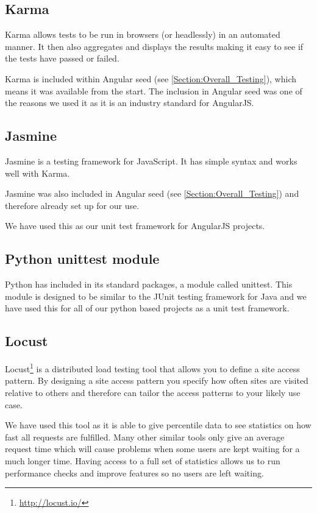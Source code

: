 \subsection{Karma}

Karma allows tests to be run in browsers (or headlessly) in an automated manner.  It then also aggregates and displays the results making it easy to see if the tests have passed or failed.

Karma is included within Angular seed (see \autoref{Section:Overall_Testing}), which means it was available from the start. The inclusion in Angular seed was one of the reasons we used it as it is an industry standard for AngularJS.

\subsection{Jasmine}

Jasmine is a testing framework for JavaScript. It has simple syntax and works well with Karma.

Jasmine was also included in Angular seed (see \autoref{Section:Overall_Testing}) and therefore already set up for our use.

We have used this as our unit test framework for AngularJS projects.

\subsection{Python unittest module}

Python has included in its standard packages, a module called unittest. This module is designed to be similar to the JUnit testing framework for Java and we have used this for all of our python based projects as a unit test framework.

\subsection{Locust}

Locust\footnote{\url{http://locust.io/}} is a distributed load testing tool that allows you to define a site access pattern. By designing a site access pattern you specify how often sites are visited relative to others and therefore can tailor the access patterns to your likely use case.

We have used this tool as it is able to give percentile data to see statistics on how fast all requests are fulfilled. Many other similar tools only give an average request time which will cause problems when some users are kept waiting for a much longer time. Having access to a full set of statistics allows us to run performance checks and improve features so no users are left waiting.

